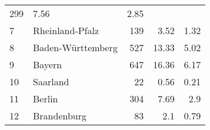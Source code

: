 \begin{longtable}{lXrrr}
       \num{299} &
       \num[round-mode=places,round-precision=2]{7,56} &
         \num[round-mode=places,round-precision=2]{2,85} \\

     7 &
     \multicolumn{1}{X}{ Rheinland-Pfalz   } &


       \num{139} &
       \num[round-mode=places,round-precision=2]{3,52} &
         \num[round-mode=places,round-precision=2]{1,32} \\

     8 &
     \multicolumn{1}{X}{ Baden-Württemberg   } &


       \num{527} &
       \num[round-mode=places,round-precision=2]{13,33} &
         \num[round-mode=places,round-precision=2]{5,02} \\

     9 &
     \multicolumn{1}{X}{ Bayern   } &


       \num{647} &
       \num[round-mode=places,round-precision=2]{16,36} &
         \num[round-mode=places,round-precision=2]{6,17} \\

     10 &
     \multicolumn{1}{X}{ Saarland   } &


       \num{22} &
       \num[round-mode=places,round-precision=2]{0,56} &
         \num[round-mode=places,round-precision=2]{0,21} \\

     11 &
     \multicolumn{1}{X}{ Berlin   } &


       \num{304} &
       \num[round-mode=places,round-precision=2]{7,69} &
         \num[round-mode=places,round-precision=2]{2,9} \\

     12 &
     \multicolumn{1}{X}{ Brandenburg   } &


       \num{83} &
       \num[round-mode=places,round-precision=2]{2,1} &
         \num[round-mode=places,round-precision=2]{0,79} \\


\end{longtable}

